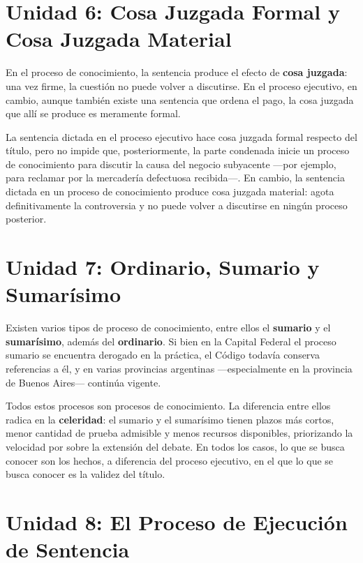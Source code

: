 \documentclass[12pt,oneside]{book}
\begin{document}
\section{Unidad 6: Cosa Juzgada Formal y Cosa Juzgada Material}

En el proceso de conocimiento, la sentencia produce el efecto de \textbf{cosa juzgada}: una vez firme, la cuestión no puede volver a discutirse. En el proceso ejecutivo, en cambio, aunque también existe una sentencia que ordena el pago, la cosa juzgada que allí se produce es meramente formal.

\begin{important}
La sentencia dictada en el proceso ejecutivo hace cosa juzgada formal respecto del título, pero no impide que, posteriormente, la parte condenada inicie un proceso de conocimiento para discutir la causa del negocio subyacente ---por ejemplo, para reclamar por la mercadería defectuosa recibida---. En cambio, la sentencia dictada en un proceso de conocimiento produce cosa juzgada material: agota definitivamente la controversia y no puede volver a discutirse en ningún proceso posterior.
\end{important}

\section{Unidad 7: Ordinario, Sumario y Sumarísimo}

Existen varios tipos de proceso de conocimiento, entre ellos el \textbf{sumario} y el \textbf{sumarísimo}, además del \textbf{ordinario}. Si bien en la Capital Federal el proceso sumario se encuentra derogado en la práctica, el Código todavía conserva referencias a él, y en varias provincias argentinas ---especialmente en la provincia de Buenos Aires--- continúa vigente.

Todos estos procesos son procesos de conocimiento. La diferencia entre ellos radica en la \textbf{celeridad}: el sumario y el sumarísimo tienen plazos más cortos, menor cantidad de prueba admisible y menos recursos disponibles, priorizando la velocidad por sobre la extensión del debate. En todos los casos, lo que se busca conocer son los hechos, a diferencia del proceso ejecutivo, en el que lo que se busca conocer es la validez del título.

\section{Unidad 8: El Proceso de Ejecución de Sentencia}
\end{document}
